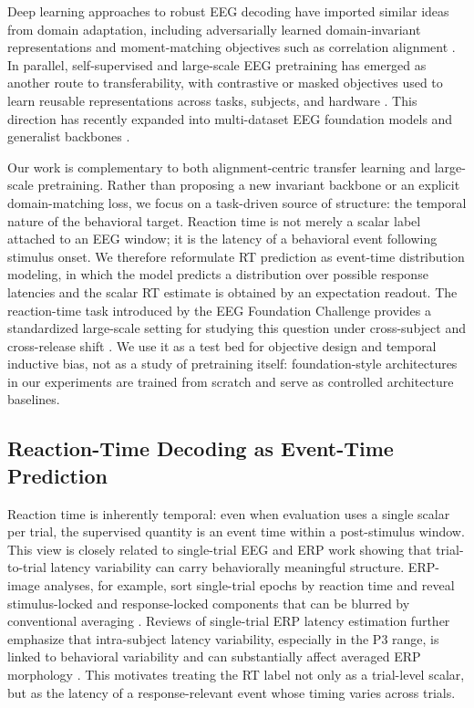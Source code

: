 \documentclass[12pt]{article}
\begin{document}
Deep learning approaches to robust EEG decoding have imported similar ideas from
domain adaptation, including adversarially learned domain-invariant representations
\citep{Ganin2016DANN} and moment-matching objectives such as correlation alignment
\citep{SunSaenko2016DeepCORAL}. In parallel, self-supervised and large-scale EEG
pretraining has emerged as another route to transferability, with contrastive or masked
objectives used to learn reusable representations across tasks, subjects, and hardware
\citep{Kostas2021BENDR}. This direction has recently expanded into multi-dataset EEG
foundation models and generalist backbones
\citep{wang2024eegpt,Jiang2024LaBraM,Chen2024EEGFormer,Wang2025EEGMamba,ElOuahidi2025REVE,Yue2024BrainGPT}.

Our work is complementary to both alignment-centric transfer learning and large-scale
pretraining. Rather than proposing a new invariant backbone or an explicit
domain-matching loss, we focus on a task-driven source of structure: the temporal nature
of the behavioral target. Reaction time is not merely a scalar label attached to an EEG
window; it is the latency of a behavioral event following stimulus onset. We therefore
reformulate RT prediction as event-time distribution modeling, in which the model
predicts a distribution over possible response latencies and the scalar RT estimate is
obtained by an expectation readout. The reaction-time task introduced by the EEG
Foundation Challenge provides a standardized large-scale setting for studying this
question under cross-subject and cross-release shift
\citep{EEGChallengeWebsite2025,EEGFoundationChallengeArxiv2025}. We use it as a
test bed for objective design and temporal inductive bias, not as a study of
pretraining itself: foundation-style architectures in our experiments are trained from
scratch and serve as controlled architecture baselines.

\subsection{Reaction-Time Decoding as Event-Time Prediction}
Reaction time is inherently temporal: even when evaluation uses a single scalar per
trial, the supervised quantity is an event time within a post-stimulus window. This view
is closely related to single-trial EEG and ERP work showing that trial-to-trial latency
variability can carry behaviorally meaningful structure. ERP-image analyses, for
example, sort single-trial epochs by reaction time and reveal stimulus-locked and
response-locked components that can be blurred by conventional averaging
\citep{Jung1998SingleTrialERP}. Reviews of single-trial ERP latency estimation further
emphasize that intra-subject latency variability, especially in the P3 range, is linked to
behavioral variability and can substantially affect averaged ERP morphology
\citep{Ouyang2017LatencyReview}. This motivates treating the RT label not only as a
trial-level scalar, but as the latency of a response-relevant event whose timing varies
across trials.
\end{document}
